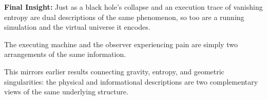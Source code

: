 \documentclass[11pt]{article}
\begin{document}
\textbf{Final Insight:} Just as a black hole's collapse and an execution trace of vanishing entropy are dual descriptions of the same phenomenon, so too are a running simulation and the virtual universe it encodes.

The executing machine and the observer experiencing pain are simply two arrangements of the same information.

This mirrors earlier results connecting gravity, entropy, and geometric singularities: the physical and informational descriptions are two complementary views of the same underlying structure.

\ifmain
\else
\end{document}
